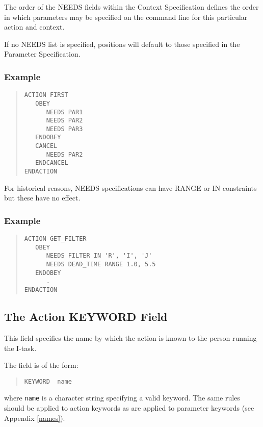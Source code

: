 \documentclass[twoside,11pt]{article}
\newcommand{\xlabel}[1]{}
\renewcommand{\_}{\texttt{\symbol{95}}}
\begin{document}
The order of the NEEDS fields within the Context Specification defines
the order in which parameters may be specified on the command line
for this particular action and context.

If no NEEDS list is specified, positions will default to those specified
in the Parameter Specification.

\subsubsection*{Example}
\begin{quote} \begin{verbatim}
ACTION FIRST
   OBEY
      NEEDS PAR1
      NEEDS PAR2
      NEEDS PAR3
   ENDOBEY
   CANCEL
      NEEDS PAR2
   ENDCANCEL
ENDACTION
\end{verbatim} \end{quote}
For historical reasons, NEEDS specifications can have RANGE or IN constraints 
but these have no effect.

\subsubsection*{Example}
\begin{quote} \begin{verbatim}
ACTION GET_FILTER
   OBEY
      NEEDS FILTER IN 'R', 'I', 'J'
      NEEDS DEAD_TIME RANGE 1.0, 5.5
   ENDOBEY
      .
ENDACTION
\end{verbatim} \end{quote}

\subsection{The Action KEYWORD Field\xlabel{the_action_keyword_field}}

This field specifies the name by which the action is known to 
the person running the I-task.

The field is of the form:
\begin{quote} \begin{verbatim}
KEYWORD  name
\end{verbatim} \end{quote}
where \texttt{name} is a character string specifying a valid keyword.
The same rules should be applied to action keywords as are applied to parameter
keywords (see Appendix \ref{names}).
\end{document}
